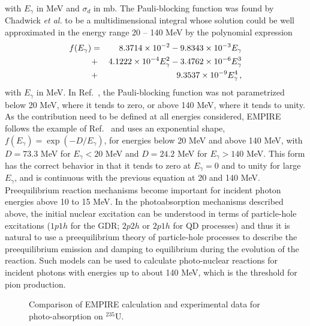 with $E_{\gamma}$ in MeV and $\sigma_{d}$ in mb. The Pauli-blocking function
was found by Chadwick \emph{et al.} to be a multidimensional integral whose
solution could be well approximated in the energy range 20 -- 140 MeV by the
polynomial expression 
\begin{eqnarray}
f(E_{\gamma}) & = & \;8.3714\times10^{-2}-9.8343\times10^{-3}E_{\gamma} 
\notag \\
&+&4.1222\times10^{-4}E_{\gamma}^{2} -3.4762\times10^{-6}E_{\gamma}^{3} 
\notag \\
&+&9.3537\times10^{-9}E_{\gamma}^{4}\,,
\end{eqnarray}
with $E_{\gamma}$ in MeV. In Ref.~\cite{chadQD}, the Pauli-blocking function
was not parametrized below 20 MeV, where it tends to zero, or above 140 MeV,
where it tends to unity. As the contribution need to be defined at all
energies considered, EMPIRE follows the example of Ref.~\cite{PHNuc} and
uses an exponential shape, $f(E_{\gamma})=\exp(-D/E_{\gamma})$, for energies
below 20 MeV and above 140 MeV, with $D=73.3$ MeV for $E_{\gamma}<20$ MeV
and $D=24.2$ MeV for $E_{\gamma}>140$ MeV. This form has the correct
behavior in that it tends to zero at $E_{\gamma}=0$ and to unity for large $%
E_{\gamma}$, and is continuous with the previous equation at 20 and 140 MeV.
Preequilibrium reaction mechanisms become important for incident photon
energies above 10 to 15 MeV. In the photoabsorption mechanisms described
above, the initial nuclear excitation can be understood in terms of
particle-hole excitations ($1p1h$ for the GDR; $2p2h$ or $2p1h$ for QD
processes) and thus it is natural to use a preequilibrium theory of
particle-hole processes to describe the preequilibrium emission and damping
to equilibrium during the evolution of the reaction. Such models can be used
to calculate photo-nuclear reactions for incident photons with energies up
to about 140 MeV, which is the threshold for pion production. 
\begin{figure}[htbp]
\caption{Comparison of EMPIRE calculation and experimental data for
photo-absorption on $^{235}$U.}
\label{u235abs}
\end{figure}

